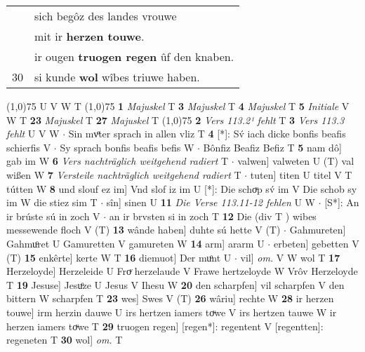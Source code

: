 \documentclass[8pt,a4paper,notitlepage]{article}
\begin{document}
\begin{table}[ht]
\begin{minipage}[t]{0.5\linewidth}
\begin{tabular}{rl}
 & sich begôz des landes vrouwe\\ 
 & mit ir \textbf{herzen touwe}.\\ 
 & ir ougen \textbf{truogen regen} ûf den knaben.\\ 
30 & si kunde \textbf{wol} wîbes triuwe haben.\\ 
\end{tabular}
\scriptsize
\line(1,0){75} \newline
U V W T \newline
\line(1,0){75} \newline
\textbf{1} \textit{Majuskel} T  \textbf{3} \textit{Majuskel} T  \textbf{4} \textit{Majuskel} T  \textbf{5} \textit{Initiale} V W T  \textbf{23} \textit{Majuskel} T  \textbf{27} \textit{Majuskel} T  \newline
\line(1,0){75} \newline
\textbf{2} \textit{Vers 113.2¹ fehlt} T  \textbf{3} \textit{Vers 113.3 fehlt} U V W   $\cdot$ Sin mvͦter sprach in allen vliz T \textbf{4} [*]: Sv́ iach dicke bonfis beafis schierfis V  $\cdot$ Sy sprach bonfis beafis befis W  $\cdot$ Bônfiz Beafiz Befiz T \textbf{5} nam dô] gab im W \textbf{6} \textit{Vers nachträglich weitgehend radiert} T   $\cdot$ valwen] valweten U (T) val wißen W \textbf{7} \textit{Versteile nachträglich weitgehend radiert} T   $\cdot$ tuten] titen U titel V T tútten W \textbf{8} und slouf ez im] Vnd slof iz im U [*]: Die schoͮp sv́ im V Die schob sy im W die stiez sim T  $\cdot$ sîn] sinen U \textbf{11} \textit{Die Verse 113.11-12 fehlen} U W   $\cdot$ [S*]: An ir brúste sú in zoch V  $\cdot$ an ir brvsten si in zoch T \textbf{12} Die (div T ) wibes messewende floch V (T) \textbf{13} wânde haben] duhte sú hette V (T)  $\cdot$ Gahmureten] Gahmuͦret U Gamuretten V gamureten W \textbf{14} arm] ararm U  $\cdot$ erbeten] gebetten V (T) \textbf{15} enkêrte] kerte W T \textbf{16} diemuot] Der muͦnt U  $\cdot$ vil] \textit{om.} V W wol T \textbf{17} Herzeloyde] Herzeleide U Froͮ herzelaude V Frawe hertzeloyde W Vrôv Herzeloyde T \textbf{19} Jesuse] Jesuͦze U Jesus V Ihesu W \textbf{20} den scharpfen] vil scharpfen V den bittern W scharpfen T \textbf{23} wes] Swes V (T) \textbf{26} wâriu] rechte W \textbf{28} ir herzen touwe] irm herzin dauwe U irs hertzen iamers toͮwe V irs hertzen tauwe W ir herzen iamers toͮwe T \textbf{29} truogen regen] [regen*]: regentent V [regentten]: regeneten T \textbf{30} wol] \textit{om.} T \newline
\end{minipage}
\end{table}
\end{document}
